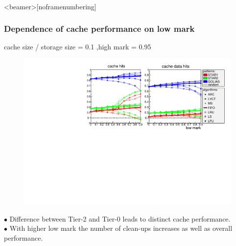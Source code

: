 \documentclass{beamer}
\begin{document}
\begin{frame}<beamer>[noframenumbering]\frametitle{Dependence of cache performance on low mark}
\vspace{-0.4cm}
\begin{tiny}	cache size / storage size = 0.1 ,high mark = 0.95 \end{tiny}
\begin{figure}
\vspace{-0.4cm}
	\begin{center}
		\centering
		\includegraphics[width=\textwidth]{pic/low-basic_color.pdf}
	\end{center}
\end{figure}	
\vspace{-0.5cm}
$\bullet $ Difference between Tier-2 and Tier-0 leads to distinct cache performance.\\
$\bullet $ With higher low mark the number of clean-ups increases as well as overall performance.\\


\end{frame}
\end{document}
